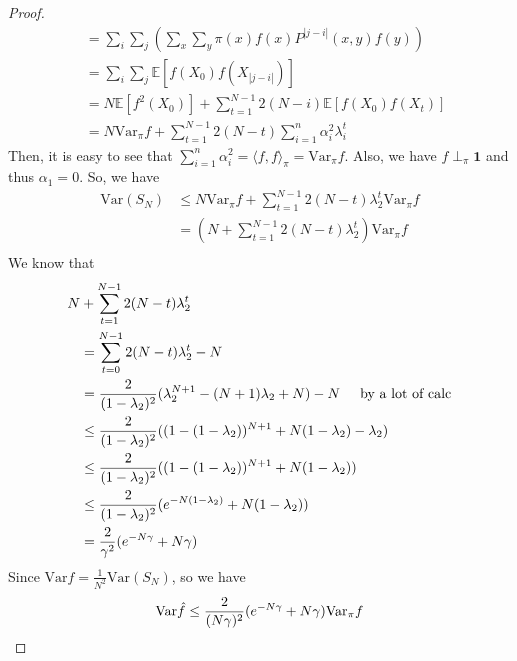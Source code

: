 \documentclass{article}
\def\<{\langle}
\def\>{\rangle}
\begin{document}
\begin{proof}
\begin{align*}
    &= \sum_i \sum_j \left( \sum_x \sum_y \pi(x) f(x) P^{|j - i|}(x, y) f(y) \right)\\
    &= \sum_i \sum_j \mathbb{E}[f(X_0)f(X_{|j-i|})] \\
    &= N\mathbb{E}[f^2(X_0)] + \sum_{t=1}^{N-1} 2(N-i) \mathbb{E}[f(X_0)f(X_t)] \\
    &= N\mathrm{Var}_\pi f + \sum_{t=1}^{N-1} 2(N - t) \sum_{i=1}^n \alpha_i^2 \lambda_i^t
  \end{align*}
  Then, it is easy to see that $\sum_{i=1}^n \alpha_i^2 = \<f, f\>_\pi = \mathrm{Var}_\pi f$.
  Also, we have $f\perp_\pi \mathbf{1}$ and thus $\alpha_1 = 0$.
  So, we have
  \begin{align*}
    \mathrm{Var}(S_N)
    &\leq N\mathrm{Var}_\pi f + \sum_{t=1}^{N-1} 2(N-t) \lambda_2^t \mathrm{Var}_\pi f \\
    &= \left(N + \sum_{t=1}^{N-1} 2(N-t) \lambda_2^t\right) \mathrm{Var}_\pi f \\
  \end{align*}
  We know that
  \begin{align*}
    N &+ \sum_{t=1}^{N-1} 2(N-t) \lambda_2^t \\
      &= \sum_{t=0}^{N-1} 2(N-t) \lambda_2^t - N \\
      &= \frac{2}{(1 - \lambda_2)^2}(\lambda_2^{N+1} - (N+1)\lambda_2 + N) - N \hspace{0.5cm} \mbox{by a lot of calc} \\
      &\leq \frac{2}{(1 - \lambda_2)^2}((1 - (1-\lambda_2))^{N+1} + N(1-\lambda_2) - \lambda_2) \\
      &\leq \frac{2}{(1 - \lambda_2)^2}((1 - (1-\lambda_2))^{N+1} + N(1-\lambda_2)) \\
      &\leq \frac{2}{(1 - \lambda_2)^2} (e^{-N(1-\lambda_2)} + N(1 - \lambda_2)) \\
      &= \frac{2}{\gamma^2}(e^{-N\gamma} + N\gamma)
  \end{align*}
  Since $\mathrm{Var} \hat{f} = \frac{1}{N^2} \mathrm{Var}(S_N)$, so we have
  \[\mathrm{Var} \hat{f} \leq \frac{2}{(N\gamma)^2} (e^{-N\gamma} + N\gamma) \mathrm{Var}_\pi f \qedhere\]
\end{proof}
\end{document}
